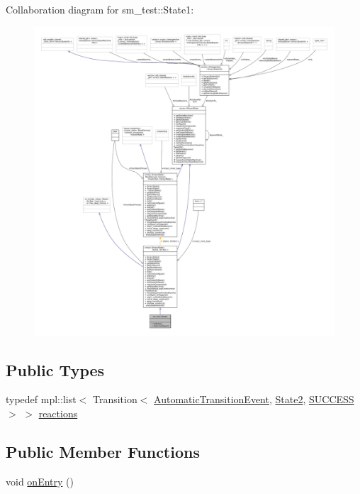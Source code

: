 Collaboration diagram for sm\+\_\+test\+:\+:State1\+:
\nopagebreak
\begin{figure}[H]
\begin{center}
\leavevmode
\includegraphics[width=350pt]{structsm__test_1_1State1__coll__graph}
\end{center}
\end{figure}
\subsection*{Public Types}
\begin{DoxyCompactItemize}
\item 
typedef mpl\+::list$<$ Transition$<$ \hyperlink{structsm__test_1_1AutomaticTransitionEvent}{Automatic\+Transition\+Event}, \hyperlink{structsm__test_1_1State2}{State2}, \hyperlink{classSUCCESS}{S\+U\+C\+C\+E\+SS} $>$ $>$ \hyperlink{structsm__test_1_1State1_a01f0fc77a7b86701dfbfb03323706218}{reactions}
\end{DoxyCompactItemize}
\subsection*{Public Member Functions}
\begin{DoxyCompactItemize}
\item 
void \hyperlink{structsm__test_1_1State1_abf2e4eb155f482dd26debcf71111f84d}{on\+Entry} ()
\end{DoxyCompactItemize}

